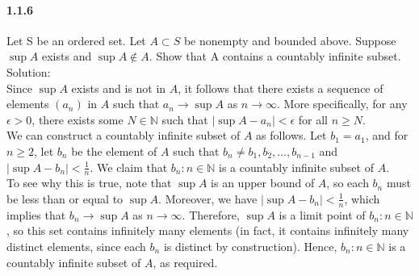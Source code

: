 \documentclass{article}
\begin{document}
\paragraph{1.1.6}
Let S be an ordered set. Let $A \subset S$ be nonempty and bounded above. Suppose $\sup A$ exists and $\sup A \notin A$. Show that A contains a countably infinite subset.\\
Solution:\\
Since $\sup A$ exists and is not in $A$, it follows that there exists a sequence of elements $(a_n)$ in $A$ such that $a_n \to \sup A$ as $n \to \infty$. More specifically, for any $\epsilon > 0$, there exists some $N \in \mathbb{N}$ such that $|\sup A - a_n| < \epsilon$ for all $n \geq N$.\\
We can construct a countably infinite subset of $A$ as follows. Let $b_1 = a_1$, and for $n \geq 2$, let $b_n$ be the element of $A$ such that $b_n \neq b_1, b_2, \ldots, b_{n-1}$ and $|\sup A - b_n| < \frac{1}{n}$. We claim that ${b_n : n \in \mathbb{N}}$ is a countably infinite subset of $A$.\\
To see why this is true, note that $\sup A$ is an upper bound of $A$, so each $b_n$ must be less than or equal to $\sup A$. Moreover, we have $|\sup A - b_n| < \frac{1}{n}$, which implies that $b_n \to \sup A$ as $n \to \infty$. Therefore, $\sup A$ is a limit point of ${b_n : n \in \mathbb{N}}$, so this set contains infinitely many elements (in fact, it contains infinitely many distinct elements, since each $b_n$ is distinct by construction). Hence, ${b_n : n \in \mathbb{N}}$ is a countably infinite subset of $A$, as required.
\end{document}

